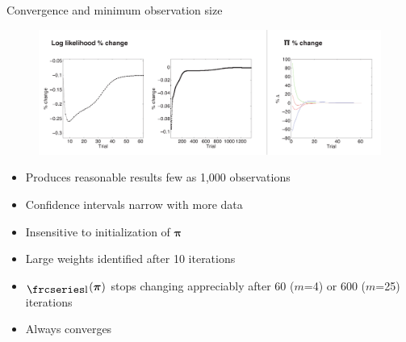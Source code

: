 \documentclass{beamer}
\newcommand{\textfrc}[1]{{\frcseries#1}}
\newcommand{\mathfrc}[1]{\raisebox{-0.8mm}{\text{\textfrc{\small #1}}}\hspace{0.4mm}}
\newcommand{\vect}[1]{\boldsymbol{\mathbf{#1}}}
\newcommand{\llp}{\mathfrc{l}(\vect{\pi})}
\begin{document}
\begin{frame}{Convergence and minimum observation size}
	
	\begin{figure}
			\begin{center}
				\includegraphics[width=\textwidth]{diag_simple.pdf}
			\end{center}
	\end{figure}
	
	\begin{itemize}
		\item Produces reasonable results few as 1,000 observations
		\item Confidence intervals narrow with more data
		\item Insensitive to initialization of $\vect{\pi}$
		\item Large weights identified after 10 iterations
		\item $\llp$ stops changing appreciably after 60 ($m$=4) or 600 ($m$=25) iterations
		\item Always converges
	\end{itemize}

	
\end{frame}
\end{document}
